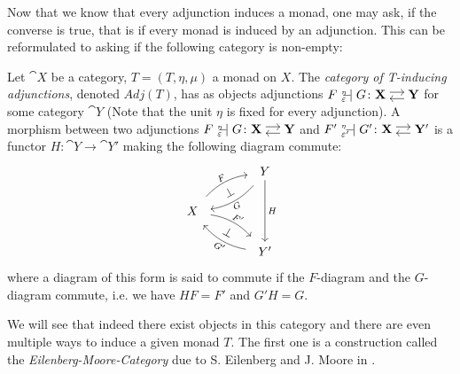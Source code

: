 Now that we know that every adjunction induces a monad, one may ask, if the converse is true,
that is if every monad is induced by an adjunction. This can be reformulated to asking if the following category is non-empty: 

\begin{definition}
    Let $\cat{X}$ be a category, $T = (T,\eta,\mu)$ a monad on $X$. The \textit{category of T-inducing adjunctions},
    denoted $Adj(T)$, has as objects adjunctions $F {\ }_{\eps}^{\text{\tiny{$\eta$}}}\!\!\!\!\adj G \colon \adjar{X}{Y}$
    for some category $\cat{Y}$ (Note that the unit $\eta$ is fixed for every adjunction).
    A morphism between two adjunctions 
    $F {\ }_{\eps}^{\text{\tiny{$\eta$}}}\!\!\!\!\adj G \colon \adjar{X}{Y}$
    and 
    $F' {\ }_{\eps'}^{\text{\tiny{$\eta$}}}\!\!\!\!\adj G' \colon \adjar{X}{Y'}$
    is a functor $H \colon \cat{Y} \to \cat{Y'}$ making the following diagram commute:
    \[
        \begin{tikzcd}[column sep = 4em]
            & Y \ar[ld,bend left=20,"G"',shorten=2mm,sloped] \ar[dd,"H"] \\
            X \ar[ru,bend left = 20,"F",shorten=2mm,sloped,pos=0.48] \ar[rd,bend left = 20,"F'",shorten=2mm,sloped,pos=0.55]
            \ar[ru,"\bot",phantom,description,sloped] \ar[rd,"\bot",phantom,description,sloped]
            & \\
            & Y' \ar[lu,bend left = 20,"G'"',shorten=2mm,sloped]
        \end{tikzcd}
    \]
    where a diagram of this form is said to commute if the $F$-diagram and the $G$-diagram commute,
    i.e. we have $HF = F'$ and $G'H = G$.
\end{definition}
We will see that indeed there exist objects in this category and there are even 
multiple ways to induce a given monad $T$. The first one is a construction called the \textit{Eilenberg-Moore-Category}
due to S. Eilenberg and J. Moore in \cite{eilenbergmoore}.


